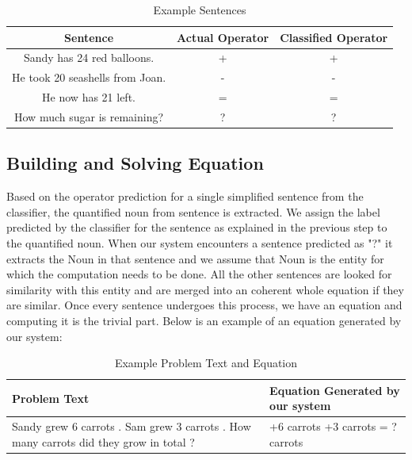 \documentclass[11pt]{article}
\begin{document}
\begin{table}[h]
\begin{center}
\begin{tabular}{|c|c|c|}
\hline
\bf Sentence & \bf Actual Operator & \bf Classified Operator\\
\hline
Sandy has 24 red balloons. & + & +\\
\hline
He took 20 seashells from Joan. & - & -\\
\hline
He now has 21 left. & = & =\\
\hline
How much sugar is remaining? & ? & ?\\
\hline
\end{tabular}
\end{center}
\caption{\label{prediction-example-table} Example Sentences}
\end{table}


\subsection{Building and Solving Equation}

Based on the operator prediction for a single simplified sentence from the classifier, the quantified noun from sentence is extracted. We assign the label predicted by the classifier for the sentence as explained in the previous step to the quantified noun. When our system encounters a sentence predicted as "?" it extracts the Noun in that sentence and we assume that Noun is the entity for which the computation needs to be done. All the other sentences are looked for similarity with this entity and are merged into an coherent whole equation if they are similar. Once every sentence undergoes this process, we have an equation and computing it is the trivial part. Below is an example of an equation generated by our system:\newline

\begin{table}[h]
\begin{center}
\begin{tabular}{|>{\centering\arraybackslash}m{8cm}|>{\centering\arraybackslash}m{6cm}|}
\hline
\bf Problem Text & \bf Equation Generated by our system\\
\hline
Sandy grew 6 carrots . Sam grew 3 carrots . How many carrots did they grow in total ? & +6 carrots +3 carrots = ? carrots\\
\hline
\end{tabular}
\end{center}
\caption{\label{equation-example-table} Example Problem Text and Equation}
\end{table}
\end{document}

